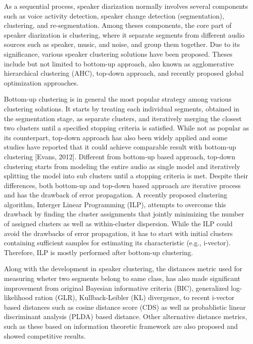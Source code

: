 \documentclass[journal]{IEEEtran}
\begin{document}
As a sequential process, speaker diarization normally involves several components such as voice activity detection, speaker change detection (segmentation), clustering, and re-segmentation. Among theses components, the core part of speaker diarization is clustering, where it separate segments from different audio sources such as speaker, music, and noise, and group them together. Due to its significance, various speaker clustering solutions have been proposed. Theses include but not limited to bottom-up approach, also known as agglomerative hierarchical clustering (AHC), top-down approach, and recently proposed global optimization approaches. 

Bottom-up clustering is in general the most popular strategy among various clustering solutions. It starts by treating each individual segments, obtained in the segmentation stage, as separate clusters, and iteratively merging the closest two clusters until a specified stopping criteria is satisfied. While not as popular as its counterpart, top-down approach has also been widely applied and some studies have reported that it could achieve comparable result with bottom-up clustering [Evans, 2012]. Different from bottom-up based approach, top-down clustering starts from modeling the entire audio as single model and iteratively splitting the model into sub clusters until a stopping criteria is met. Despite their differences, both bottom-up and top-down based approach are iterative process and has the drawback of error propagation. A recently proposed clustering algorithm, Interger Linear Programming (ILP), attempts to overcome this drawback by finding the cluster assignments that jointly minimizing the number of assigned clusters as well as within-cluster dispersion. While the ILP could avoid the drawbacks of error propagation, it has to start with initial clusters containing sufficient samples for estimating its characteristic (e.g., i-vector). Therefore, ILP is mostly performed after bottom-up clustering.

Along with the development in speaker clustering, the distances metric used for measuring wheter two segments belong to same class, has also made significant improvement from original Bayesian informative criteria (BIC), generalized log-likelihood ration (GLR), Kullback-Leibler (KL) divergence, to recent i-vector based distances such as cosine distance score (CDS) as well as probablistic linear discriminant analysis (PLDA) based distance. Other alternative distance metrics, such as these based on information theoretic framework are also proposed and showed competitive results. 
\end{document}
